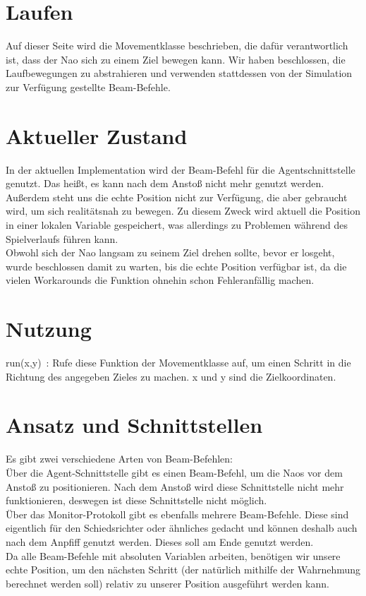 \section*{Laufen}
Auf dieser Seite wird die Movementklasse beschrieben, die dafür 
verantwortlich ist, dass der Nao sich zu einem Ziel bewegen kann. Wir 
haben beschlossen, die Laufbewegungen zu abstrahieren und verwenden 
stattdessen von der Simulation zur Verfügung gestellte Beam-Befehle.

\section*{Aktueller Zustand}
In der aktuellen Implementation wird der Beam-Befehl für die 
Agentschnittstelle genutzt. Das heißt, es kann nach dem Anstoß nicht mehr genutzt werden. Außerdem steht uns die echte Position nicht zur 
Verfügung, die aber gebraucht wird, um sich realitätsnah zu bewegen. Zu 
diesem Zweck wird aktuell die Position in einer lokalen Variable 
gespeichert, was allerdings zu Problemen während des Spielverlaufs 
führen kann.\\
Obwohl sich der Nao langsam zu seinem Ziel drehen sollte, bevor er
 losgeht, wurde beschlossen damit zu warten, bis die echte Position 
verfügbar ist, da die vielen Workarounds die Funktion ohnehin schon 
Fehleranfällig machen. 

\section*{Nutzung}
run(x,y)~: Rufe diese Funktion der Movementklasse auf, um einen 
Schritt in die Richtung des angegeben Zieles zu machen. x und y sind die
 Zielkoordinaten.

\section*{Ansatz und Schnittstellen}
Es gibt zwei verschiedene Arten von Beam-Befehlen: \\
Über die Agent-Schnittstelle gibt es einen Beam-Befehl, um die 
Naos vor dem Anstoß zu positionieren. Nach dem Anstoß wird diese 
Schnittstelle nicht mehr funktionieren, deswegen ist diese Schnittstelle 
nicht möglich.\\
Über das Monitor-Protokoll gibt es ebenfalls mehrere 
Beam-Befehle. Diese sind eigentlich für den Schiedsrichter oder 
ähnliches gedacht und können deshalb auch nach dem Anpfiff genutzt 
werden. Dieses soll am Ende genutzt werden.\\
Da alle Beam-Befehle mit absoluten Variablen arbeiten, benötigen 
wir unsere echte Position, um den nächsten Schritt (der natürlich 
mithilfe der Wahrnehmung berechnet werden soll) relativ zu unserer 
Position ausgeführt werden kann.

